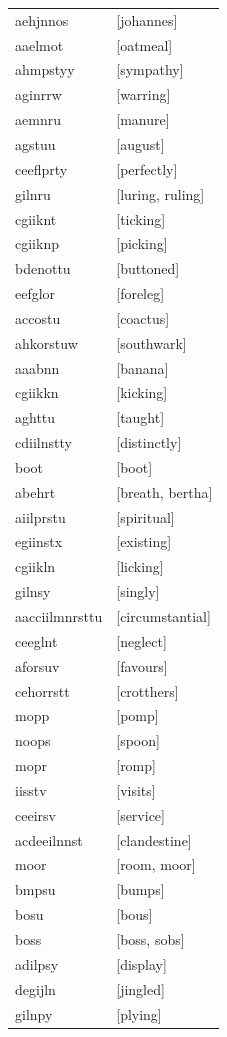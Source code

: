 \documentclass{article}
\begin{document}
\begin{tabular}{ll}
aehjnnos & [johannes] \\
aaelmot & [oatmeal] \\
ahmpstyy & [sympathy] \\
aginrrw & [warring] \\
aemnru & [manure] \\
agstuu & [august] \\
ceeflprty & [perfectly] \\
gilnru & [luring, ruling] \\
cgiiknt & [ticking] \\
cgiiknp & [picking] \\
bdenottu & [buttoned] \\
eefglor & [foreleg] \\
accostu & [coactus] \\
ahkorstuw & [southwark] \\
aaabnn & [banana] \\
cgiikkn & [kicking] \\
aghttu & [taught] \\
cdiilnstty & [distinctly] \\
boot & [boot] \\
abehrt & [breath, bertha] \\
aiilprstu & [spiritual] \\
egiinstx & [existing] \\
cgiikln & [licking] \\
gilnsy & [singly] \\
aacciilmnrsttu & [circumstantial] \\
ceeglnt & [neglect] \\
aforsuv & [favours] \\
cehorrstt & [crotthers] \\
mopp & [pomp] \\
noops & [spoon] \\
mopr & [romp] \\
iisstv & [visits] \\
ceeirsv & [service] \\
acdeeilnnst & [clandestine] \\
moor & [room, moor] \\
bmpsu & [bumps] \\
bosu & [bous] \\
boss & [boss, sobs] \\
adilpsy & [display] \\
degijln & [jingled] \\
gilnpy & [plying] \\

\end{tabular}
\end{document}
